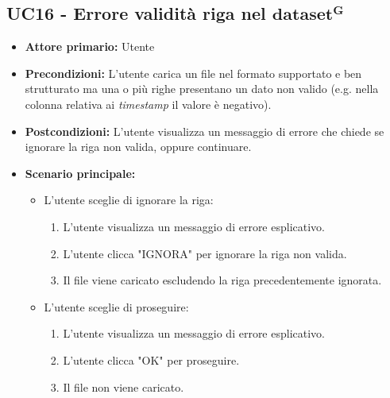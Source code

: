 \subsection{UC16 - Errore validità riga nel ${\mathbf{dataset^{G}}}$}
\label{sec:UC16 - Errore validità riga}
\begin{itemize}
    \item \textbf{Attore primario:} Utente
    \item \textbf{Precondizioni:} L'utente carica un file nel formato supportato e ben strutturato ma una o più righe presentano un dato non valido (e.g. nella colonna relativa ai \textit{timestamp} il valore è negativo).  
    \item \textbf{Postcondizioni:} L'utente visualizza un messaggio di errore che chiede se ignorare la riga non valida, oppure continuare.
    \item \textbf{Scenario principale:}
    \begin{itemize}
        \item   L'utente sceglie di ignorare la riga:
                \begin{enumerate}
                    \item L'utente visualizza un messaggio di errore esplicativo.
                    \item L'utente clicca "IGNORA" per ignorare la riga non valida.
                    \item Il file viene caricato escludendo la riga precedentemente ignorata.
                \end{enumerate} 
        \item   L'utente sceglie di proseguire:
                \begin{enumerate}
                    \item L'utente visualizza un messaggio di errore esplicativo.
                    \item L'utente clicca "OK" per proseguire.
                    \item Il file non viene caricato.
                \end{enumerate} 
    \end{itemize}
\end{itemize}


